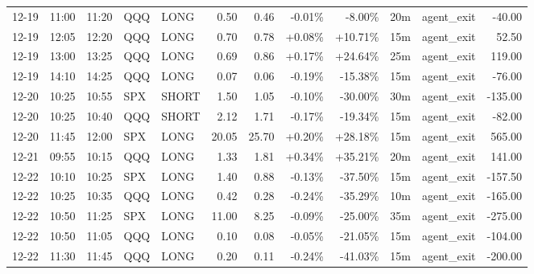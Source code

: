 \documentclass[11pt,a4paper]{article}
\begin{document}
\begin{center}
\begin{longtable}{>{\color{txtmain}}l l l l l r r r r r >{\color{txtmain}}l r}
12-19 & 11:00 & 11:20 & QQQ & LONG & 0.50 & 0.46 & \textcolor{lossred}{-0.01\%} & \textcolor{lossred}{-8.00\%} & 20m & agent\_exit & \textcolor{lossred}{-40.00} \\
12-19 & 12:05 & 12:20 & QQQ & LONG & 0.70 & 0.78 & \textcolor{wingreen}{+0.08\%} & \textcolor{wingreen}{+10.71\%} & 15m & agent\_exit & \textcolor{wingreen}{52.50} \\
12-19 & 13:00 & 13:25 & QQQ & LONG & 0.69 & 0.86 & \textcolor{wingreen}{+0.17\%} & \textcolor{wingreen}{+24.64\%} & 25m & agent\_exit & \textcolor{wingreen}{119.00} \\
12-19 & 14:10 & 14:25 & QQQ & LONG & 0.07 & 0.06 & \textcolor{lossred}{-0.19\%} & \textcolor{lossred}{-15.38\%} & 15m & agent\_exit & \textcolor{lossred}{-76.00} \\
12-20 & 10:25 & 10:55 & SPX & SHORT & 1.50 & 1.05 & \textcolor{lossred}{-0.10\%} & \textcolor{lossred}{-30.00\%} & 30m & agent\_exit & \textcolor{lossred}{-135.00} \\
12-20 & 10:25 & 10:40 & QQQ & SHORT & 2.12 & 1.71 & \textcolor{lossred}{-0.17\%} & \textcolor{lossred}{-19.34\%} & 15m & agent\_exit & \textcolor{lossred}{-82.00} \\
12-20 & 11:45 & 12:00 & SPX & LONG & 20.05 & 25.70 & \textcolor{wingreen}{+0.20\%} & \textcolor{wingreen}{+28.18\%} & 15m & agent\_exit & \textcolor{wingreen}{565.00} \\
12-21 & 09:55 & 10:15 & QQQ & LONG & 1.33 & 1.81 & \textcolor{wingreen}{+0.34\%} & \textcolor{wingreen}{+35.21\%} & 20m & agent\_exit & \textcolor{wingreen}{141.00} \\
12-22 & 10:10 & 10:25 & SPX & LONG & 1.40 & 0.88 & \textcolor{lossred}{-0.13\%} & \textcolor{lossred}{-37.50\%} & 15m & agent\_exit & \textcolor{lossred}{-157.50} \\
12-22 & 10:25 & 10:35 & QQQ & LONG & 0.42 & 0.28 & \textcolor{lossred}{-0.24\%} & \textcolor{lossred}{-35.29\%} & 10m & agent\_exit & \textcolor{lossred}{-165.00} \\
12-22 & 10:50 & 11:25 & SPX & LONG & 11.00 & 8.25 & \textcolor{lossred}{-0.09\%} & \textcolor{lossred}{-25.00\%} & 35m & agent\_exit & \textcolor{lossred}{-275.00} \\
12-22 & 10:50 & 11:05 & QQQ & LONG & 0.10 & 0.08 & \textcolor{lossred}{-0.05\%} & \textcolor{lossred}{-21.05\%} & 15m & agent\_exit & \textcolor{lossred}{-104.00} \\
12-22 & 11:30 & 11:45 & QQQ & LONG & 0.20 & 0.11 & \textcolor{lossred}{-0.24\%} & \textcolor{lossred}{-41.03\%} & 15m & agent\_exit & \textcolor{lossred}{-200.00} \\

\end{longtable}
\end{center}
\end{document}
